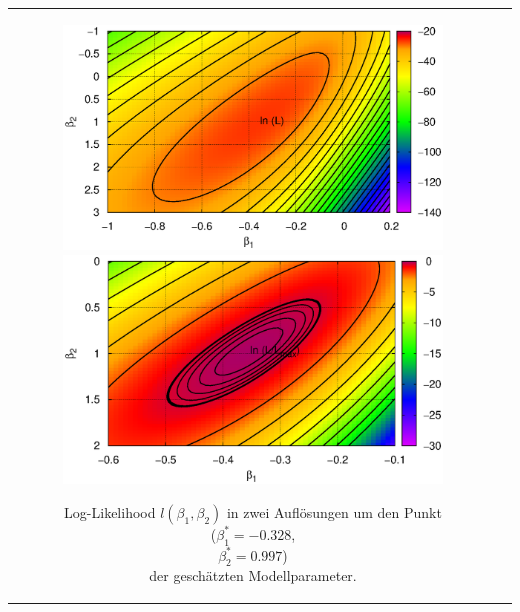 \documentclass[a4paper]{foils}
\begin{document}
\begin{landscape}
\begin{center}
\newpage
\vspace{-2em}
\begin{tabular}{cc}
\parbox{0.8\textwidth}{
  \includegraphics[width=0.8\textwidth]{./figsDiscr/BNL_kalib_logL1.eps}
\vspace{-4em}\\
  \includegraphics[width=0.8\textwidth]{./figsDiscr/BNL_kalib_logL2.eps}
\vspace{-4em}
}
\hspace{0.1\textwidth}
\parbox{0.4\textwidth}{
Log-Likelihood $l(\beta_1,\beta_2)$ in zwei
Aufl\"osungen um den Punkt\\
 ($\beta_1^*=-0.328$,\\
  $\beta_2^*=0.997$)\\
 der gesch\"atzten Modell\-parameter.
}
\end{tabular}


\end{center}
\end{landscape}
\end{document}
